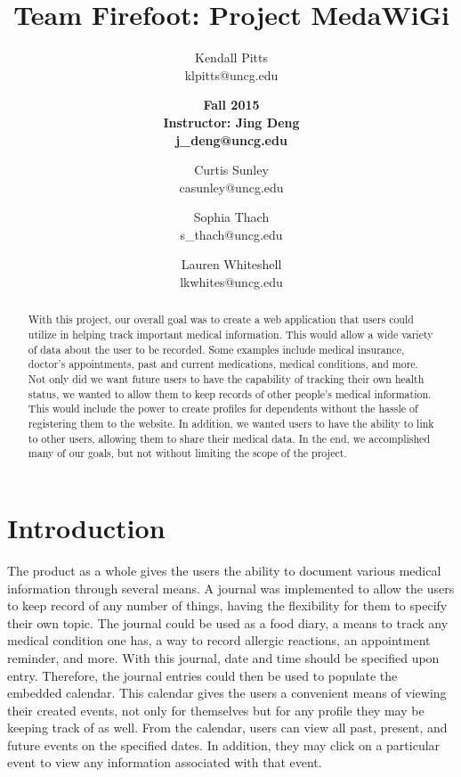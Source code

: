 \documentclass[twocolumn,12pt]{article}
\begin{document}
\title{\bf Team Firefoot: Project MedaWiGi}

\author
	{
	Kendall Pitts\\
	klpitts@uncg.edu\\
	\and
	\vspace{3pt}
	\bf Fall 2015\\
	\bf Instructor: Jing Deng\\
	\bf j\_deng@uncg.edu\\
	\and 
	Curtis Sunley\\
	casunley@uncg.edu
	\and 
	Sophia Thach\\
	s\_thach@uncg.edu
	\and 
	Lauren Whiteshell\\
	lkwhites@uncg.edu
	}
	
\date{}
\maketitle

\begin{abstract}
With this project, our overall goal was to create a web application that users could utilize in helping track important medical information. This would allow a wide variety of data about the user to be recorded. Some examples include medical insurance, doctor's appointments, past and current medications, medical conditions, and more. Not only did we want future users to have the capability of tracking their own health status, we wanted to allow them to keep records of other people's medical information. This would include the power to create profiles for dependents without the hassle of registering them to the website. In addition, we wanted users to have the ability to link to other users, allowing them to share their medical data. In the end, we accomplished many of our goals, but not without limiting the scope of the project.

\end{abstract}

\section{Introduction}
The product as a whole gives the users the ability to document various medical information through several means. A journal was implemented to allow the users to keep record of any number of things, having the flexibility for them to specify their own topic. The journal could be used as a food diary, a means to track any medical condition one has, a way to record allergic reactions, an appointment reminder, and more. With this journal, date and time should be specified upon entry. Therefore, the journal entries could then be used to populate the embedded calendar. This calendar gives the users a convenient means of viewing their created events, not only for themselves but for any profile they may be keeping track of as well. From the calendar, users can view all past, present, and future events on the specified dates. In addition, they may click on a particular event to view any information associated with that event. 
\end{document}
